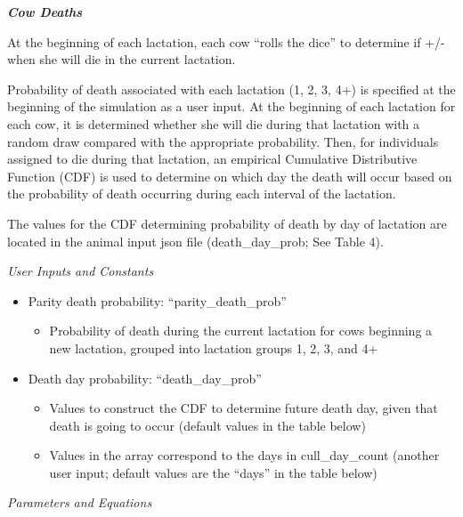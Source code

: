 \documentclass{article}
\begin{document}
\begin{refsection}
\textbf{\textit{Cow Deaths}} 
\vspace{0.3cm}

At the beginning of each lactation, each cow “rolls the dice” to determine if +/- when she will die in the current lactation. 
    
Probability of death associated with each lactation (1, 2, 3, 4+) is specified at the beginning of the simulation as a user input. At the beginning of each lactation for each cow, it is determined whether she will die during that lactation with a random draw compared with the appropriate probability. Then, for individuals assigned to die during that lactation, an empirical Cumulative Distributive Function (CDF) is used to determine on which day the death will occur based on the probability of death occurring during each interval of the lactation. 

The values for the CDF determining probability of death by day of lactation are located in the animal input json file (death\_day\_prob; See Table 4). 


         \textit{User Inputs and Constants}
         \vspace{0.1cm}

         \begin{itemize}
             \item Parity death probability: “parity\_death\_prob” 
            \begin{itemize}
                \item Probability of death during the current lactation for cows beginning a new lactation, grouped into lactation groups 1, 2, 3, and 4+
            \end{itemize}
             \item Death day probability: “death\_day\_prob”
             \begin{itemize}
                 \item Values to construct the CDF to determine future death day, given that death is going to occur (default values in the table below) 
                 \item Values in the array correspond to the days in cull\_day\_count (another user input; default values are the “days” in the table below) 
             \end{itemize}

         \end{itemize}

         \textit{Parameters and Equations}
         \vspace{0.1cm}
         

\end{refsection}
\end{document}
